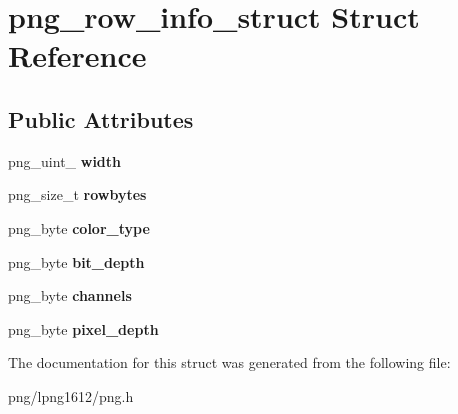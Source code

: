 \hypertarget{structpng__row__info__struct}{\section{png\+\_\+row\+\_\+info\+\_\+struct Struct Reference}
\label{structpng__row__info__struct}
}
\subsection*{Public Attributes}
\begin{DoxyCompactItemize}
\item 
\hypertarget{structpng__row__info__struct_a1ab107da5ffee8100eeaa76cc5ba3e62}{png\+\_\+uint\+\_ {\bfseries width}}\label{structpng__row__info__struct_a1ab107da5ffee8100eeaa76cc5ba3e62}

\item 
\hypertarget{structpng__row__info__struct_a924a208653f2577c05db5e1cf3aa5817}{png\+\_\+size\+\_\+t {\bfseries rowbytes}}\label{structpng__row__info__struct_a924a208653f2577c05db5e1cf3aa5817}

\item 
\hypertarget{structpng__row__info__struct_a646244422549c66e6661cfcdb67c8e28}{png\+\_\+byte {\bfseries color\+\_\+type}}\label{structpng__row__info__struct_a646244422549c66e6661cfcdb67c8e28}

\item 
\hypertarget{structpng__row__info__struct_a6b14d5d0cc32f151c28c568cf1c1f82d}{png\+\_\+byte {\bfseries bit\+\_\+depth}}\label{structpng__row__info__struct_a6b14d5d0cc32f151c28c568cf1c1f82d}

\item 
\hypertarget{structpng__row__info__struct_a7cefee70361a3789a862001aefcd872f}{png\+\_\+byte {\bfseries channels}}\label{structpng__row__info__struct_a7cefee70361a3789a862001aefcd872f}

\item 
\hypertarget{structpng__row__info__struct_a70b84917ef9eabc9b7d29ec96fd01153}{png\+\_\+byte {\bfseries pixel\+\_\+depth}}\label{structpng__row__info__struct_a70b84917ef9eabc9b7d29ec96fd01153}

\end{DoxyCompactItemize}


The documentation for this struct was generated from the following file\+:\begin{DoxyCompactItemize}
\item 
png/lpng1612/png.\+h\end{DoxyCompactItemize}
